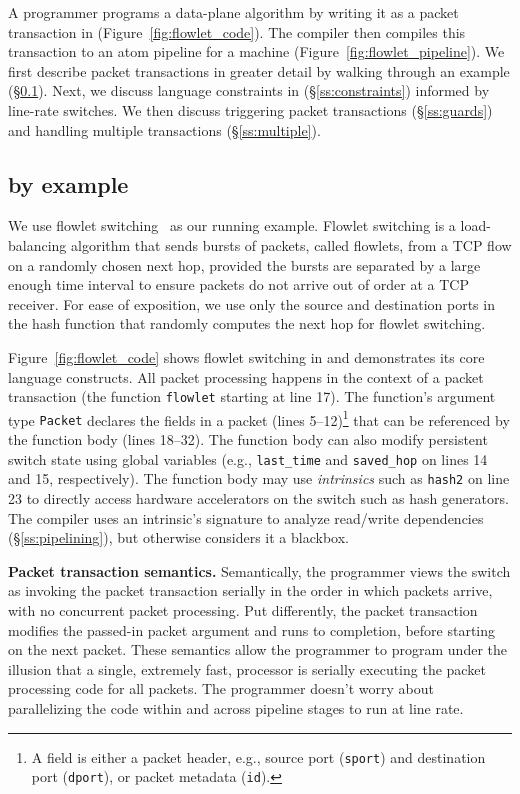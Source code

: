 A programmer programs a data-plane algorithm by writing it as
a packet transaction in \pktlanguage (Figure~\ref{fig:flowlet_code}).  The
\pktlanguage compiler then compiles this transaction to an atom pipeline for a
\absmachine machine (Figure~\ref{fig:flowlet_pipeline}). We first describe
packet transactions in greater detail by walking through an example
(\S\ref{ss:flowlet}). Next, we discuss language constraints in \pktlanguage
(\S\ref{ss:constraints}) informed by line-rate switches.  We then discuss
triggering packet transactions (\S\ref{ss:guards}) and handling multiple
transactions (\S\ref{ss:multiple}).

\subsection{\pktlanguage by example}
\label{ss:flowlet}

We use flowlet switching~\cite{flowlets} as our running example. Flowlet
switching is a load-balancing algorithm that sends bursts of packets, called
flowlets, from a TCP flow on a randomly chosen next hop, provided the bursts
are separated by a large enough time interval to ensure packets do not arrive
out of order at a TCP receiver. For ease of exposition, we use only the source
and destination ports in the hash function that randomly computes the next hop
for flowlet switching.

Figure~\ref{fig:flowlet_code} shows flowlet switching in \pktlanguage and
demonstrates its core language constructs. All packet processing happens in the
context of a packet transaction (the function \texttt{flowlet} starting at line
17). The function's argument type {\tt Packet} declares the fields in a packet
(lines 5--12)\footnote{A field is either a packet header, e.g.,
source port ({\tt sport}) and destination port ({\tt dport}), or packet
 metadata ({\tt id}).} that can be referenced by the function body (lines
18--32).  The function body can also modify persistent switch state using
global variables (e.g., \texttt{last\_time} and \texttt{saved\_hop} on lines 14
and 15, respectively). The function body may use \textit{intrinsics} such as
\texttt{hash2} on line 23 to directly access hardware accelerators on the
switch such as hash generators.  The \pktlanguage compiler uses an intrinsic's
signature to analyze read/write dependencies (\S\ref{ss:pipelining}), but otherwise considers it a blackbox.

\medskip
\noindent
\textbf{Packet transaction semantics.}
Semantically, the programmer views the switch as invoking the packet transaction
serially in the order in which packets arrive, with no concurrent packet
processing.  Put differently, the packet transaction modifies the passed-in
packet argument and runs to completion, before starting on the next packet.
These semantics allow the programmer to program under the illusion that a
single, extremely fast, processor is serially executing the packet processing code for
all packets. The programmer doesn't worry about parallelizing the code within
and across pipeline stages to run at line rate.

